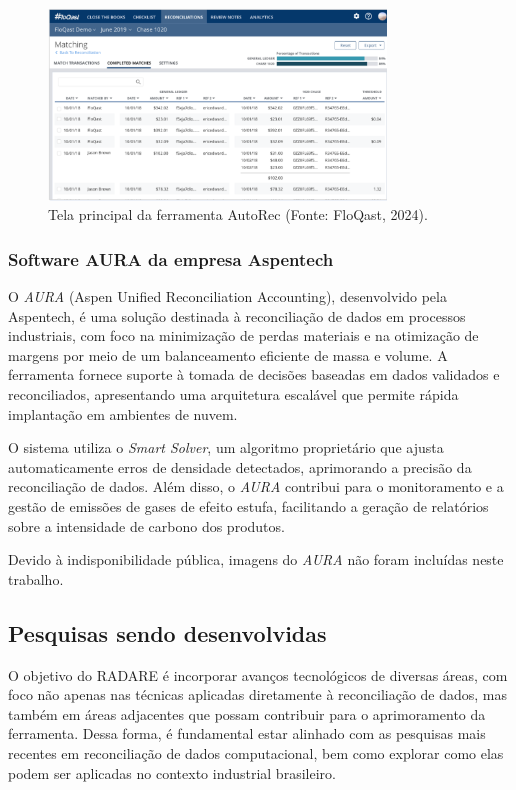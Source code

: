 \begin{figure}[htbp!]
	\centering
	\includegraphics[width=0.8\textwidth]{figuras/floqast-autorec.png}
	\caption{Tela principal da ferramenta AutoRec (Fonte: FloQast, 2024).}
	\label{fig:AutoRec}
\end{figure}

\subsubsection{Software AURA da empresa Aspentech}

O \textit{AURA} (Aspen Unified Reconciliation Accounting), desenvolvido pela Aspentech, é uma solução destinada à reconciliação de dados em processos industriais, com foco na minimização de perdas materiais e na otimização de margens por meio de um balanceamento eficiente de massa e volume. A ferramenta fornece suporte à tomada de decisões baseadas em dados validados e reconciliados, apresentando uma arquitetura escalável que permite rápida implantação em ambientes de nuvem.

O sistema utiliza o \textit{Smart Solver}, um algoritmo proprietário que ajusta automaticamente erros de densidade detectados, aprimorando a precisão da reconciliação de dados. Além disso, o \textit{AURA} contribui para o monitoramento e a gestão de emissões de gases de efeito estufa, facilitando a geração de relatórios sobre a intensidade de carbono dos produtos.

Devido à indisponibilidade pública, imagens do \textit{AURA} não foram incluídas neste trabalho.

\subsection{Pesquisas sendo desenvolvidas}

O objetivo do RADARE é incorporar avanços tecnológicos de diversas áreas, com foco não apenas nas técnicas aplicadas diretamente à reconciliação de dados, mas também em áreas adjacentes que possam contribuir para o aprimoramento da ferramenta. Dessa forma, é fundamental estar alinhado com as pesquisas mais recentes em reconciliação de dados computacional, bem como explorar como elas podem ser aplicadas no contexto industrial brasileiro.

